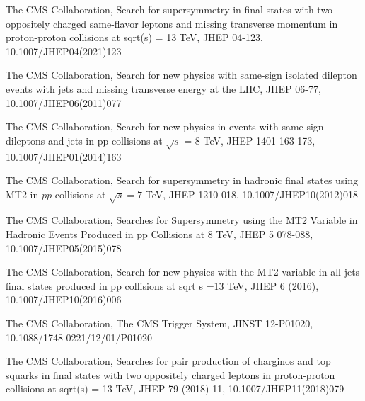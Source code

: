 \begin{thebibliography}{20}
  {The CMS Collaboration, Search for supersymmetry in final states with two oppositely charged same-flavor leptons and missing transverse momentum in proton-proton collisions at sqrt(s) = 13 TeV, JHEP 04-123, 10.1007/JHEP04(2021)123}
    
  {The CMS Collaboration, Search for new physics with same-sign isolated dilepton events with jets and missing transverse energy at the LHC, JHEP 06-77, 10.1007/JHEP06(2011)077}

  {}

  {The CMS Collaboration, Search for new physics in events with same-sign dileptons and jets in pp collisions at $\sqrt{s}$ = 8 TeV, JHEP 1401 163-173, 10.1007/JHEP01(2014)163}
  
  {}
  
  {The CMS Collaboration, Search for supersymmetry in hadronic final states using MT2 in $pp$ collisions at $\sqrt{s} = 7$ TeV, JHEP 1210-018, 10.1007/JHEP10(2012)018}

  {The CMS Collaboration, Searches for Supersymmetry using the MT2 Variable in Hadronic Events Produced in pp Collisions at 8 TeV, JHEP 5 078-088, 10.1007/JHEP05(2015)078}

  {The CMS Collaboration, Search for new physics with the MT2 variable in all-jets final states produced in pp collisions at sqrt s =13 TeV, JHEP 6 (2016), 10.1007/JHEP10(2016)006}
  
  {}

  {The CMS Collaboration, The CMS Trigger System, JINST 12-P01020, 10.1088/1748-0221/12/01/P01020}

  {The CMS Collaboration, Searches for pair production of charginos and top squarks in final states with two oppositely charged leptons in proton-proton collisions at sqrt(s) = 13 TeV, JHEP 79 (2018) 11, 10.1007/JHEP11(2018)079}
  

\end{thebibliography}
